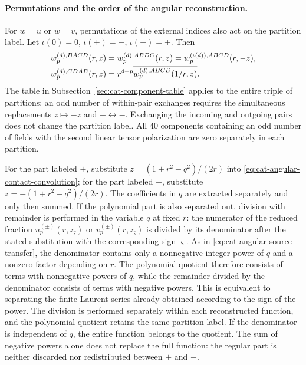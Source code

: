 \documentclass[11pt,a4paper]{article}
\begin{document}
\paragraph{Permutations and the order of the angular reconstruction.}
For $w=u$ or $w=v$, permutations of the external indices also act on the partition label. Let $\iota(0)=0$, $\iota(+)=-$, $\iota(-)=+$. Then
\begin{equation}
\shortstack[l]{$\displaystyle
 w_p^{(d),BACD}(r,z)=w_p^{(d),ABDC}(r,z)
                  =w_p^{(\iota(d)),ABCD}(r,-z),$\\
$\displaystyle
 w_p^{(d),CDAB}(r,z)=r^{4+p}\overline{w_p^{(d),ABCD}(1/r,z)}.$}
\label{eq:cat-partition-permutations}
\end{equation}
The table in Subsection~\ref{sec:cat-component-table} applies to the entire triple of partitions: an odd number of within-pair exchanges requires the simultaneous replacements $z\mapsto-z$ and $+\leftrightarrow-$. Exchanging the incoming and outgoing pairs does not change the partition label. All 40 components containing an odd number of fields with the second linear tensor polarization are zero separately in each partition.

For the part labeled $+$, substitute $z=(1+r^2-q^2)/(2r)$ into \eqref{eq:cat-angular-contact-convolution}; for the part labeled $-$, substitute $z=-(1+r^2-q^2)/(2r)$. The coefficients in $q$ are extracted separately and only then summed. If the polynomial part is also separated out, division with remainder is performed in the variable $ q $ at fixed $ r $: the numerator of the reduced fraction $ u_p^{(\pm)}(r,z_\varsigma) $ or $ v_p^{(\pm)}(r,z_\varsigma) $ is divided by its denominator after the stated substitution with the corresponding sign $ \varsigma $. As in \eqref{eq:cat-angular-source-transfer}, the denominator contains only a nonnegative integer power of $ q $ and a nonzero factor depending on $ r $. The polynomial quotient therefore consists of terms with nonnegative powers of $ q $, while the remainder divided by the denominator consists of terms with negative powers. This is equivalent to separating the finite Laurent series already obtained according to the sign of the power. The division is performed separately within each reconstructed function, and the polynomial quotient retains the same partition label. If the denominator is independent of $ q $, the entire function belongs to the quotient. The sum of negative powers alone does not replace the full function: the regular part is neither discarded nor redistributed between $ + $ and $ - $.
\end{document}

